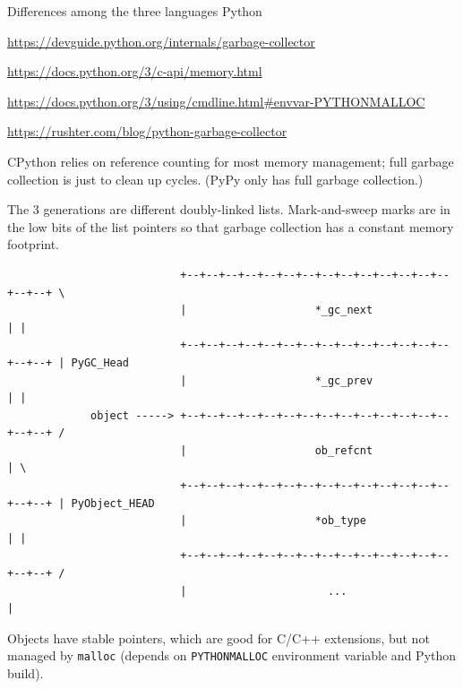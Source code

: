 \documentclass[aspectratio=169]{beamer}
\begin{document}
\begin{frame}[fragile]{Differences among the three languages}
\vspace{0.1 cm}
\Huge
Python \hfill {\tiny \begin{minipage}{0.7\linewidth}\hfill \textcolor{blue}{\url{https://devguide.python.org/internals/garbage-collector}}

\hfill \textcolor{blue}{\url{https://docs.python.org/3/c-api/memory.html}}

\hfill \textcolor{blue}{\url{https://docs.python.org/3/using/cmdline.html\#envvar-PYTHONMALLOC}}

\hfill \textcolor{blue}{\url{https://rushter.com/blog/python-garbage-collector}}\end{minipage}}

\vspace{0.25 cm}
\normalsize
CPython relies on reference counting for most memory management; full garbage collection is just to clean up cycles. (PyPy only has full garbage collection.)

\vspace{0.2 cm}
The 3 generations are different doubly-linked lists. Mark-and-sweep marks are in the low bits of the list pointers so that garbage collection has a constant memory footprint.

\tiny
\begin{verbatim}
                           +--+--+--+--+--+--+--+--+--+--+--+--+--+--+--+--+ \
                           |                    *_gc_next                  | |
                           +--+--+--+--+--+--+--+--+--+--+--+--+--+--+--+--+ | PyGC_Head
                           |                    *_gc_prev                  | |
             object -----> +--+--+--+--+--+--+--+--+--+--+--+--+--+--+--+--+ /
                           |                    ob_refcnt                  | \
                           +--+--+--+--+--+--+--+--+--+--+--+--+--+--+--+--+ | PyObject_HEAD
                           |                    *ob_type                   | |
                           +--+--+--+--+--+--+--+--+--+--+--+--+--+--+--+--+ /
                           |                      ...                      |
\end{verbatim}

\normalsize
Objects have stable pointers, which are good for C/C++ extensions, but not managed by \texttt{malloc} (depends on \texttt{PYTHONMALLOC} environment variable and Python build).
\end{frame}
\end{document}
